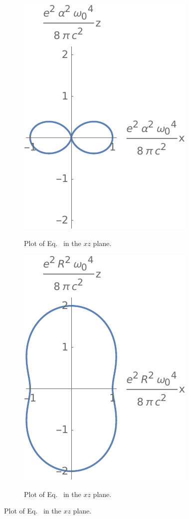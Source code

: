\begin{figure}[b!]
	\begin{minipage}{0.475\textwidth}
		\begin{figure}[H] \flushright
			\includegraphics{3a} $\ $
			\caption{Plot of Eq.~ in the $xz$ plane.}
			\label{3a}
		\end{figure}
	\end{minipage}%
	\hspace{0.05\linewidth}%
	\begin{minipage}{0.475\textwidth}
		\begin{figure}[H] \flushright
			\includegraphics{3b} $\ $
			\caption{Plot of Eq.~ in the $xz$ plane.}
			\label{3b}
		\end{figure}
	\end{minipage}
	

\end{figure}
